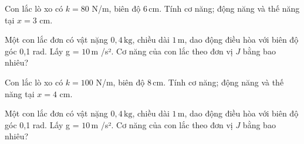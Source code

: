 
\begin{bt}
Con lắc lò xo có $k=80$ N/m, biên độ $6\,\text{cm}$. Tính cơ năng; động năng và thế năng tại $x=3$ cm.
\end{bt}

\begin{ex}
Một con lắc đơn có vật nặng $0,4\,\text{kg}$, chiều dài $1\,\text{m}$, dao động điều hòa với biên độ góc 0,1 rad. Lấy g = $10\,\text{m}$ /s². Cơ năng của con lắc theo đơn vị $J$ bằng bao nhiêu?
\end{ex}


\begin{bt}
Con lắc lò xo có $k=100$ N/m, biên độ $8\,\text{cm}$. Tính cơ năng; động năng và thế năng tại $x=4$ cm.
\end{bt}

\begin{ex}
Một con lắc đơn có vật nặng $0,4\,\text{kg}$, chiều dài $1\,\text{m}$, dao động điều hòa với biên độ góc 0,1 rad. Lấy g = $10\,\text{m}$ /s². Cơ năng của con lắc theo đơn vị $J$ bằng bao nhiêu?
\end{ex}



